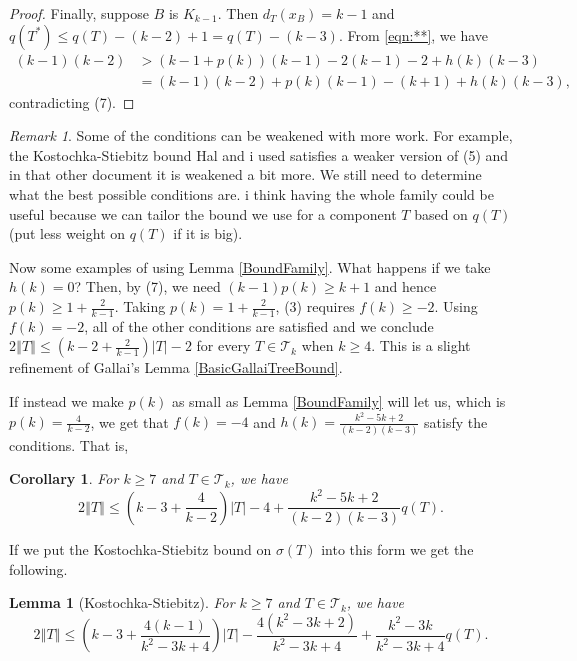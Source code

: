 \documentclass[12pt]{article}
\theoremstyle{plain}
\newtheorem{lem}[thm]{Lemma}
\newtheorem{cor}[thm]{Corollary}
\theoremstyle{definition}
\theoremstyle{remark}
\newtheorem*{remark}{Remark}
\newcommand{\fancy}[1]{\mathcal{#1}}
\newcommand{\T}{\fancy{T}}
\newcommand{\card}[1]{\left|#1\right|}
\newcommand{\size}[1]{\left\Vert#1\right\Vert}
\newcommand{\parens}[1]{\left( #1 \right)}
\begin{document}
\begin{proof}
 	Finally, suppose $B$ is $K_{k-1}$.  Then $d_T(x_B) = k - 1$ and $q(T^*) \le q(T) - (k-2) + 1 = q(T) - (k-3)$.  From \ref{eqn:**}, we have
 	\begin{align*}
	 	(k-1)(k-2) &> (k-1 + p(k))(k-1) - 2(k-1) - 2 + h(k)(k-3)\\
	 	&= (k-1)(k-2) + p(k)(k-1) - (k+1) + h(k)(k-3),
 	\end{align*}
 	contradicting (7).
\end{proof}

\begin{remark}
	Some of the conditions can be weakened with more work.  For example, the Kostochka-Stiebitz bound Hal and i used satisfies a weaker version of (5) and in that other document it is weakened a bit more.  We still need to determine what the 
	best possible conditions are.  i think having the whole family could be useful because we can tailor the bound we use for a component $T$ based on $q(T)$ (put less weight on $q(T)$ if it is big).
\end{remark}

Now some examples of using Lemma \ref{BoundFamily}.  What happens if we take $h(k) = 0$?  Then, by (7), we need $(k-1)p(k) \ge k + 1$ and hence $p(k) \ge 1 + \frac{2}{k-1}$.  Taking $p(k) = 1 + \frac{2}{k-1}$, (3) requires $f(k) \ge -2$.  Using $f(k) = -2$, all of the other conditions are satisfied and we conclude $2\size{T} \le \parens{k-2 + \frac{2}{k-1}}\card{T} - 2$ for every $T \in \T_k$ when $k \ge 4$.  This is a slight refinement of Gallai's Lemma \ref{BasicGallaiTreeBound}.

If instead we make $p(k)$ as small as Lemma \ref{BoundFamily} will let us, which is $p(k) = \frac{4}{k-2}$, we get that $f(k) = -4$ and $h(k) = \frac{k^2-5k+2}{(k-2)(k-3)}$ satisfy the conditions.  That is,

\begin{cor}\label{SmallP}
	For $k \ge 7$ and $T \in \T_k$, we have
	\[2\size{T} \le (k-3 + \frac{4}{k-2})\card{T} -4 + \frac{k^2-5k+2}{(k-2)(k-3)}q(T).\]
\end{cor}

If we put the Kostochka-Stiebitz bound on $\sigma(T)$ into this form we get the following.

\begin{lem}[Kostochka-Stiebitz]
		For $k \ge 7$ and $T \in \T_k$, we have
		\[2\size{T} \le (k-3 + \frac{4(k-1)}{k^2 - 3k + 4})\card{T} - \frac{4(k^2-3k+2)}{k^2-3k+4} + \frac{k^2 - 3k}{k^2-3k+4}q(T).\]
\end{lem}
\end{document}
